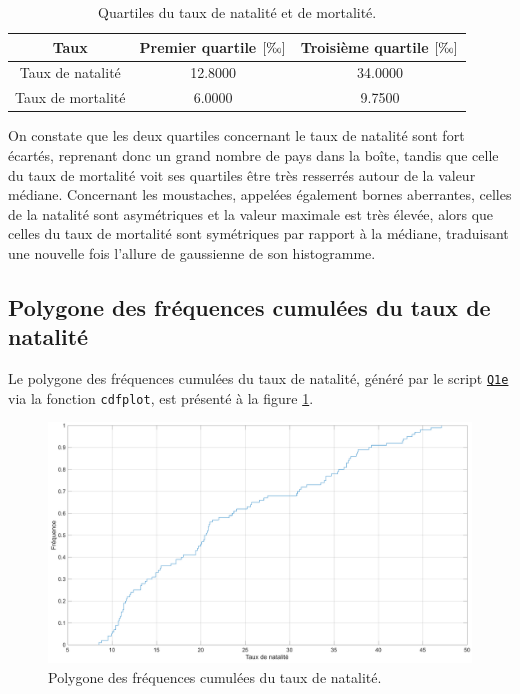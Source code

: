 \documentclass[a4paper, 12pt]{article}
\begin{document}
	\begin{table}[!ht]
	    \centering
	    \begin{tabular}{|c|c|c|}
	        \hline
	        \textbf{Taux} & \textbf{Premier quartile} \(\left [\text{\textperthousand} \right ]\) & \textbf{Troisième quartile} \(\left [\text{\textperthousand} \right ]\)\\ \hline
	        \hline
	        Taux de natalité & \num{12.8000} & \num{34.0000}\\ \hline
	        Taux de mortalité & \num{6.0000} & \num{9.7500}\\ \hline
	    \end{tabular}
	    \caption{Quartiles du taux de natalité et de mortalité.}
	    \label{tab:Q1d}
	\end{table}
	
	On constate que les deux quartiles concernant le taux de natalité sont fort écartés, reprenant donc un grand nombre de pays dans la boîte, tandis que celle du taux de mortalité voit ses quartiles être très resserrés autour de la valeur médiane. Concernant les moustaches, appelées également bornes aberrantes, celles de la natalité sont asymétriques et la valeur maximale est très élevée, alors que celles du taux de mortalité sont symétriques par rapport à la médiane, traduisant une nouvelle fois l'allure de gaussienne de son histogramme.
	
	\subsection{Polygone des fréquences cumulées du taux de natalité}
	Le polygone des fréquences cumulées du taux de natalité, généré par le script \hyperref[subsec:code-Q1]{\texttt{Q1e}} via la fonction \texttt{cdfplot}, est présenté à la figure \ref{fig:Q1e}.\par
	
	\begin{figure}[!ht]
	    \centering
	    \includegraphics[width=\textwidth]{resources/pdf/figures/Q1e.pdf}
	    \caption{Polygone des fréquences cumulées du taux de natalité.}
	    \label{fig:Q1e}
	\end{figure}
	
\end{document}
